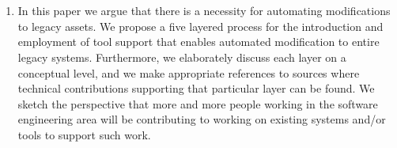 

%
\cleardoublepage
{}


\chapter{}


\begin{englishtext}
\begin{enumerate}

    \item In this paper we argue that there is a necessity for automating modifications to legacy assets.
    We propose a five layered process for the introduction and employment of tool support that
    enables automated modification to entire legacy systems. Furthermore, we elaborately discuss
    each layer on a conceptual level, and we make appropriate references to sources where technical
    contributions supporting that particular layer can be found. We sketch the perspective that more
    and more people working in the software engineering area will be contributing to working on
    existing systems and/or tools to support such work. \cite{legacyAssets}



\end{enumerate}
\end{englishtext}


